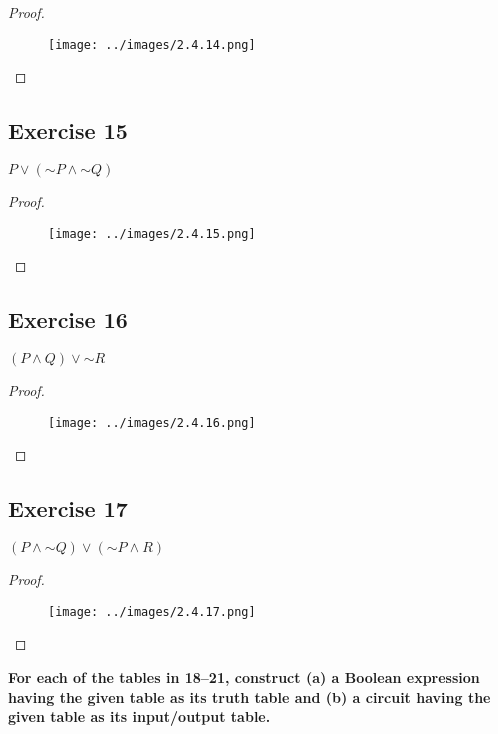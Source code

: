 \documentclass[14pt]{extarticle}
\begin{document}
\begin{proof}
    \begin{figure}[ht!]
        \centering
        \texttt{[image: ../images/2.4.14.png]}
    \end{figure}
\end{proof}

\subsection{Exercise 15}
$P \vee ({\sim P} \wedge {\sim Q})$

\begin{proof}
    \begin{figure}[ht!]
        \centering
        \texttt{[image: ../images/2.4.15.png]}
    \end{figure}
\end{proof}

\subsection{Exercise 16}
$(P \wedge Q) \vee {\sim R}$

\begin{proof}
    \begin{figure}[ht!]
        \centering
        \texttt{[image: ../images/2.4.16.png]}
    \end{figure}
\end{proof}

\subsection{Exercise 17}
$(P \wedge {\sim Q}) \vee ({\sim P} \wedge R)$

\begin{proof}
    \begin{figure}[ht!]
        \centering
        \texttt{[image: ../images/2.4.17.png]}
    \end{figure}
\end{proof}

{\bf \color{cyan} For each of the tables in 18–21, construct (a) a Boolean expression having the given table as its truth table and (b) a circuit having the given table as its input/output table.}
\end{document}
